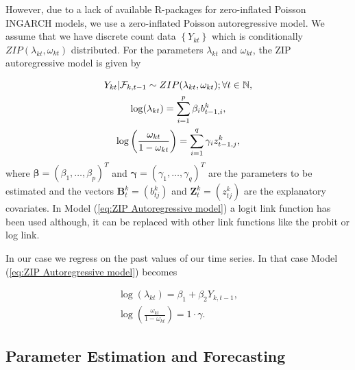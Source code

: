 However, due to a lack of available R-packages for zero-inflated Poisson INGARCH models, we use a zero-inflated Poisson autoregressive model. We assume that we have discrete count data $\left\{Y_{kt}\right\}$ which is conditionally $ZIP(\lambda_{kt},\omega_{kt})$ distributed. For the parameters $\lambda_{kt}$ and $\omega_{kt}$, the ZIP autoregressive model is given by \textcite{Yang:2012}

\begin{equation}
\begin{gathered}
Y_{kt} | \SigA_{k,t-1} \sim ZIP(\lambda_{kt},\omega_{kt}); \forall t \in \mathbb{N}, \\
\log(\lambda_{kt}) = \sum_{i=1}^p\beta_i b^k_{t-1,i},\\ %
\log\left(\frac{\omega_{kt}}{1-\omega_{kt}}\right)=\sum_{i=1}^q\gamma_i z^k_{t-1,j},%
\label{eq:ZIP Autoregressive model}
\end{gathered}
\end{equation}
%
where $\bm{\beta} = (\beta_1,\ldots,\beta_p)^T$ and $\bm{\gamma}=(\gamma_1,\ldots,\gamma_q)^T$ are the parameters to be estimated and the vectors $\bm{B}^k_t=(b^k_{tj})$ and $\bm{Z}^k_{t}=(z^k_{tj})$ are the explanatory covariates. In Model (\ref{eq:ZIP Autoregressive model}) a logit link function has been used although, it can be replaced with other link functions like the probit or log link. 

In our case we regress on the past values of our time series. In that case Model (\ref{eq:ZIP Autoregressive model}) becomes

\begin{equation}
\begin{gathered}
\log(\lambda_{kt}) = \beta_1 + \beta_2 Y_{k,t-1},\\%
\log\left(\frac{\omega_{kt}}{1-\omega_{kt}}\right)= 1 \cdot \gamma.
\label{eq:ZIP Autoregressive model timeseries}
\end{gathered}
\end{equation}


\subsection{Parameter Estimation and Forecasting}
\label{sec: ZIM Parameter Estimation and Forecasting}

